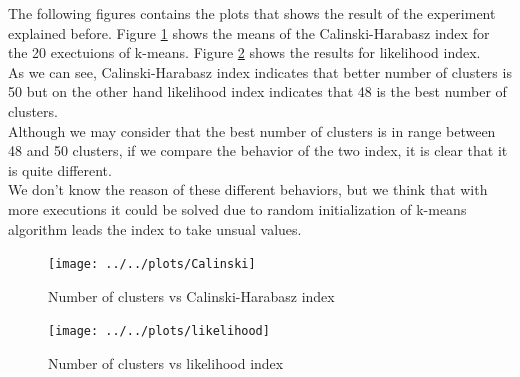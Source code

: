 \documentclass[a4paper]{article} %
\begin{document}
The following figures contains the plots that shows the result of the experiment explained before. Figure \ref{calinski} shows the means of the Calinski-Harabasz index for the 20 exectuions of k-means. Figure \ref{likelihood} shows the results for likelihood index. \\

As we can see, Calinski-Harabasz index indicates that better number of clusters is 50 but on the other hand likelihood index indicates that 48 is the best number of clusters. \\
Although we may consider that the best number of clusters is in range between 48 and 50 clusters, if we compare the behavior of the two index, it is clear that it is quite different. \\
We don't know the reason of these different behaviors, but we think that with more executions it could be solved due to random initialization of k-means algorithm leads the index to take unsual values.
\begin{figure}[H]
	\centering
	\label{calinski}
\texttt{[image: ../../plots/Calinski]}
	\caption{Number of clusters vs Calinski-Harabasz index}
\end{figure}


\begin{figure}[H]
	\centering
	\label{likelihood}
	\texttt{[image: ../../plots/likelihood]}
	\caption{Number of clusters vs likelihood index}
\end{figure}



\printbibliography

\end{document}
